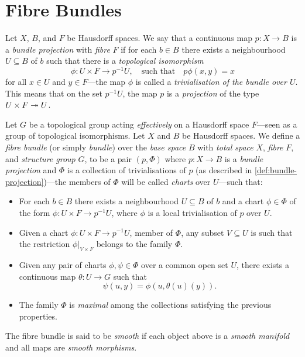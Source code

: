 \documentclass[../../../deep-dive]{subfile}
\begin{document}
\section{Fibre Bundles}

\begin{definition}
\label{def:bundle-projection}
Let \(X\), \(B\), and \(F\) be Hausdorff spaces. We say that a continuous map
\(p: X \to B\) is a \emph{bundle projection} with \emph{fibre} \(F\) if for each
\(b \in B\) there exists a neighbourhood \(U \subseteq B\) of \(b\) such that
there is a \emph{topological isomorphism}
\[
\phi: U \times F \longrightarrow p^{-1} U,
\quad\text{such that}\quad
p \phi(x, y) = x
\]
for all \(x \in U\) and \(y \in F\)---the map \(\phi\) is called a
\emph{trivialisation of the bundle over \(U\)}. This means that on the set
\(p^{-1} U\), the map \(p\) is a \emph{projection} of the type
\(U \times F \twoheadrightarrow U\).
\end{definition}

\begin{definition}
\label{def:fibre-bundle}
Let \(G\) be a topological group acting \emph{effectively} on a Hausdorff space
\(F\)---seen as a group of topological isomorphisms. Let \(X\) and \(B\) be
Hausdorff spaces. We define a \emph{fibre bundle} (or simply \emph{bundle}) over
the \emph{base space} \(B\) with \emph{total space} \(X\), \emph{fibre} \(F\),
and \emph{structure group} \(G\), to be a pair \((p, \Phi)\) where
\(p: X \to B\) is a \emph{bundle projection} and \(\Phi\) is a collection of
trivialisations of \(p\) (as described in \cref{def:bundle-projection})---the
members of \(\Phi\) will be called \emph{charts} over \(U\)---such that:
\begin{itemize}\setlength\itemsep{0em}
\item For each \(b \in B\) there exists a neighbourhood \(U \subseteq B\) of
  \(b\) and a chart \(\phi \in \Phi\) of the form
  \(\phi: U \times F \to p^{-1} U\), where \(\phi\) is a local trivialisation of
  \(p\) over \(U\).

\item Given a chart \(\phi: U \times F \to p^{-1} U\), member of \(\Phi\), any
  subset \(V \subseteq U\) is such that the restriction \(\phi|_{V \times F}\)
  belongs to the family \(\Phi\).

\item Given any pair of charts \(\phi, \psi \in \Phi\) over a common open set
  \(U\), there exists a continuous map \(\theta: U \to G\) such that
  \[
  \psi(u, y) = \phi(u, \theta(u)(y)).
  \]

\item The family \(\Phi\) is \emph{maximal} among the collections satisfying the
  previous properties.
\end{itemize}
The fibre bundle is said to be \emph{smooth} if each object above is a
\emph{smooth manifold} and all maps are \emph{smooth morphisms}.
\end{definition}
\end{document}
